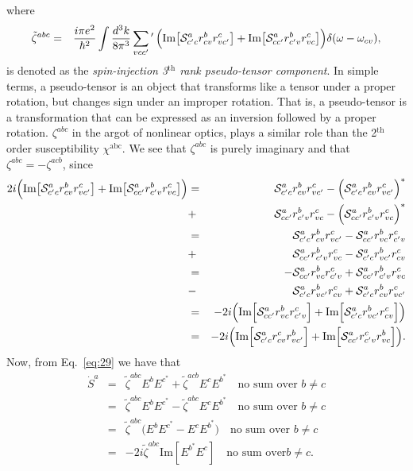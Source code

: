 \documentclass[floatfix,prb,aps,superscriptaddress,11pt]{revtex4}
\begin{document}
where
\begin{eqnarray}\label{trace52}
\tilde\zeta^{abc}
&=&
\frac{i\pi e^2}{\hbar^2}
\int\frac{d^3k}{8\pi^3}
\sum_{vcc'}\phantom{}^\prime\,
\Big(
\mbox{Im}\big[
{\cal S}^a_{c'c}r^b_{cv}r^c_{vc'}
\big]
+
\mbox{Im}\big[
{\cal S}^a_{cc'}r^b_{c'v}r^c_{vc}
\big]
\Big)
\delta(\omega-\omega_{cv})
,
\end{eqnarray}
is
denoted as the \textit{spin-injection 3$^\mathrm{th}$ rank
 pseudo-tensor component}.
 In simple terms, a pseudo-tensor is an object that transforms like a
  tensor under a proper rotation, but changes sign under an improper
  rotation. That is, a pseudo-tensor is a transformation that can be
  expressed as an inversion followed by a proper rotation.
$\zeta^{abc}$ in the argot of nonlinear optics, plays
a similar role than the 2$^\mathrm{th}$ order susceptibility
$\chi^{\mathrm{abc}}$. We see that $\zeta^{abc}$ is purely imaginary
and that $\zeta^{abc}=-\zeta^{acb}$, since 
\begin{eqnarray}\label{proof}
2i\Big(
\mbox{Im}\big[{\cal S}^a_{c'c}r^b_{cv}r^c_{vc'}\big]
+
\mbox{Im}\big[{\cal S}^a_{cc'}r^b_{c'v}r^c_{vc}\big]
\Big)
&=&
{\cal S}^a_{c'c}r^b_{cv}r^c_{vc'}
-
\Big({\cal S}^a_{c'c}r^b_{cv}r^c_{vc'}
\Big)^*
\nonumber \\
&+&
{\cal S}^a_{cc'}r^b_{c'v}r^c_{vc}
-
\Big(
{\cal S}^a_{cc'}r^b_{c'v}r^c_{vc}
\Big)^*
\nonumber \\
&=&
{\cal S}^a_{c'c}r^b_{cv}r^c_{vc'}
-
{\cal S}^a_{cc'}r^b_{vc}r^c_{c'v}
\nonumber \\
&+&
{\cal S}^a_{cc'}r^b_{c'v}r^c_{vc}
-
{\cal S}^a_{c'c}r^b_{vc'}r^c_{cv}
\nonumber \\
&=&
-
{\cal S}^a_{cc'}r^b_{vc}r^c_{c'v}
+
{\cal S}^a_{cc'}r^b_{c'v}r^c_{vc}
\nonumber\\
&-&
{\cal S}^a_{c'c}r^b_{vc'}r^c_{cv}
+
{\cal S}^a_{c'c}r^b_{cv}r^c_{vc'}
\nonumber \\
&=&
-2i\Big(
\mbox{Im}\Big[{\cal S}^a_{cc'}r^b_{vc}r^c_{c'v}\Big]
+
\mbox{Im}\Big[{\cal S}^a_{c'c}r^b_{vc'}r^c_{cv}\Big]
\Big)
\nonumber \\
&=&
-2i\Big(
\mbox{Im}\Big[{\cal S}^a_{c'c}r^c_{cv}r^b_{vc'}\Big]
+
\mbox{Im}\Big[{\cal S}^a_{cc'}r^c_{c'v}r^b_{vc}\Big]
\Big)
.
\end{eqnarray}
Now, from Eq.~\eqref{eq:29} we have that
\begin{eqnarray}\label{esdot}
 \dot{S}^a 
&=&
\tilde\zeta^{abc}
E^b
E^{c^*}
+
\tilde\zeta^{acb}
E^c
E^{b^*}\quad\mbox{no sum over } b\neq c
\nonumber\\
&=&
\tilde\zeta^{abc}
E^b
E^{c^*}
-
\tilde\zeta^{abc}
E^c
E^{b^*}\quad\mbox{no sum over } b\neq c
\nonumber\\
&=&
\tilde\zeta^{abc}
\big(
E^b
E^{c^*}
-
E^c
E^{b^*}
\big)\quad\mbox{no sum over } b\neq c
\nonumber\\
&=&
-2i\tilde\zeta^{abc}
\mbox{Im}[
E^{b^*}
E^c
]
\quad\mbox{no sum over} b\neq c
.
\end{eqnarray}
\end{document}
